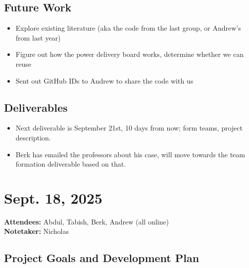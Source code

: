 \documentclass{article}
\begin{document}
		\subsection*{Future Work}
			\begin{itemize}
				\item Explore existing literature (aka the code from the last group, or Andrew's from last year)
				\item Figure out how the power delivery board works, determine whether we can reuse 
				\item Sent out GitHub IDs to Andrew to share the code with us
			\end{itemize}
		\subsection*{Deliverables}
			\begin{itemize}
				\item Next deliverable is September 21st, 10 days from now; form teams, project description. 
				\item Berk has emailed the professors about his case, will move towards the team formation deliverable based on that. 
			\end{itemize}
	\pagebreak
	\section*{Sept. 18, 2025}
	\textbf{Attendees:} Abdul, Tabish, Berk, Andrew (all online) \\
	\textbf{Notetaker:} Nicholas	
		\subsection*{Project Goals and Development Plan}
\end{document}
